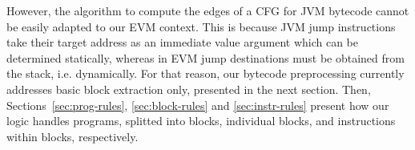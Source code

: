 \documentclass[sigplan,10pt,review]{acmart}\settopmatter{printfolios=true,printccs=false,printacmref=false}
\newcommand{\ttrip}[5]{\mathit{#1} \vdash_{\mathrm{#2}}[#3]\:#4\:[#5]}
\begin{document}
However, the algorithm to compute the edges of a CFG for JVM bytecode
cannot be easily adapted to our EVM context.
This is because JVM jump instructions
take their target address as an immediate value argument which can be determined statically,
whereas in EVM jump destinations
must be obtained from the stack, i.e. dynamically. For that reason, our bytecode preprocessing
currently addresses basic block extraction only, presented in the next section.
Then, Sections~\ref{sec:prog-rules}, \ref{sec:block-rules} and \ref{sec:instr-rules} 
present how our logic handles programs, splitted into blocks, individual blocks, and
instructions within blocks, respectively. 
%
%       
%
%
\end{document}
